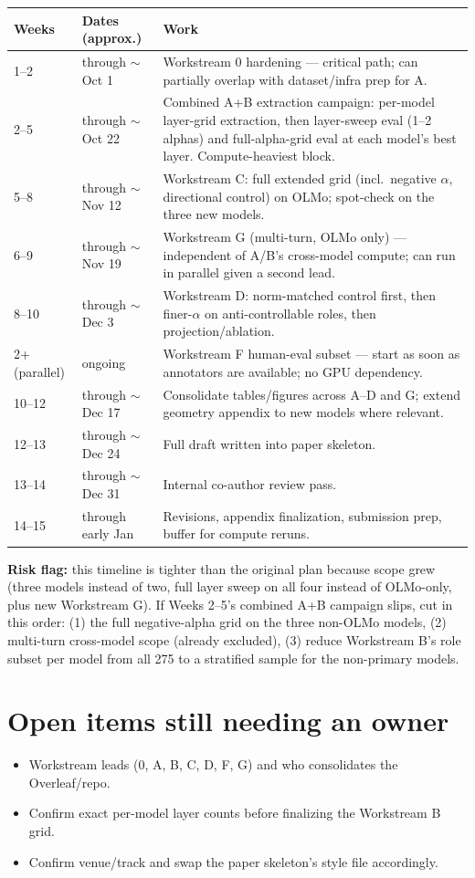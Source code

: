 \documentclass[11pt]{article}
\begin{document}
\begin{longtable}{@{}p{1.6cm}p{2.3cm}p{10.5cm}@{}}
\toprule
\textbf{Weeks} & \textbf{Dates (approx.)} & \textbf{Work} \\
\midrule
\endhead
1--2 & through $\sim$Oct 1 & Workstream 0 hardening --- critical path; can partially overlap
  with dataset/infra prep for A. \\
2--5 & through $\sim$Oct 22 & Combined A+B extraction campaign: per-model layer-grid
  extraction, then layer-sweep eval (1--2 alphas) and full-alpha-grid eval at each model's
  best layer. Compute-heaviest block. \\
5--8 & through $\sim$Nov 12 & Workstream C: full extended grid (incl.\ negative $\alpha$,
  directional control) on OLMo; spot-check on the three new models. \\
6--9 & through $\sim$Nov 19 & Workstream G (multi-turn, OLMo only) --- independent of A/B's
  cross-model compute; can run in parallel given a second lead. \\
8--10 & through $\sim$Dec 3 & Workstream D: norm-matched control first, then finer-$\alpha$
  on anti-controllable roles, then projection/ablation. \\
2+ (parallel) & ongoing & Workstream F human-eval subset --- start as soon as annotators
  are available; no GPU dependency. \\
10--12 & through $\sim$Dec 17 & Consolidate tables/figures across A--D and G; extend
  geometry appendix to new models where relevant. \\
12--13 & through $\sim$Dec 24 & Full draft written into paper skeleton. \\
13--14 & through $\sim$Dec 31 & Internal co-author review pass. \\
14--15 & through early Jan & Revisions, appendix finalization, submission prep, buffer for
  compute reruns. \\
\bottomrule
\end{longtable}

\noindent\textbf{Risk flag:} this timeline is tighter than the original plan because scope
grew (three models instead of two, full layer sweep on all four instead of OLMo-only, plus
new Workstream G). If Weeks 2--5's combined A+B campaign slips, cut in this order: (1) the
full negative-alpha grid on the three non-OLMo models, (2) multi-turn cross-model scope
(already excluded), (3) reduce Workstream B's role subset per model from all 275 to a
stratified sample for the non-primary models.

\section*{Open items still needing an owner}
\begin{itemize}
  \item Workstream leads (0, A, B, C, D, F, G) and who consolidates the Overleaf/repo.
  \item Confirm exact per-model layer counts before finalizing the Workstream B grid.
  \item Confirm venue/track and swap the paper skeleton's style file accordingly.
\end{itemize}
\end{document}

